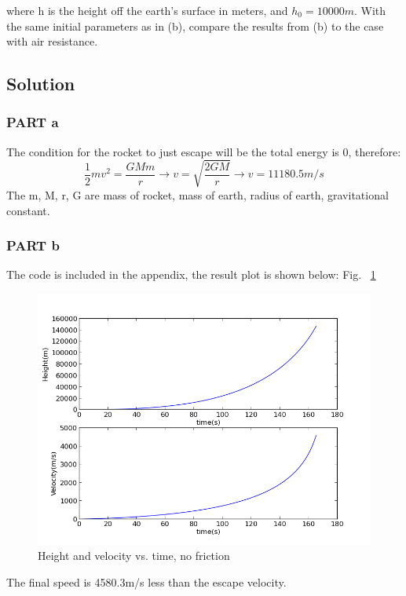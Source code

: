 \documentclass[11pt,letterpaper]{article}
\begin{document}
 where h is the height off the earth’s surface in meters,
  and $h_0 = 10000 m$. With the same initial parameters as in (b),
 compare the results from (b) to the case with air resistance.


\subsection{Solution}

\subsubsection{PART a}
The condition for the rocket to just escape will be the total energy is 0, therefore:
$$
\frac{1}{2}mv^2=\frac{GMm}{r} \longrightarrow v=\sqrt{\frac{2GM}{r}}  
\longrightarrow v=11180.5m/s
$$
The m, M, r, G are mass of rocket, mass of earth, radius of earth, gravitational constant.


\subsubsection{PART b}


The code is included in the appendix, the result plot is shown below: Fig. ~\ref{figure1}

\begin{figure}
\begin{center}
\includegraphics[width=0.8\linewidth,angle=0]{p1b.png}
\caption{Height and velocity vs. time, no friction}
\label{figure1}
\end{center}
\end{figure}

The final speed is 4580.3m/s less than the escape velocity.
\end{document}
